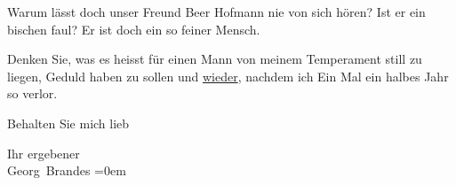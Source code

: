 \pstart
           Warum lässt doch unser Freund Beer Hofmann nie
               von sich hören? Ist er ein bischen faul? Er ist doch ein so feiner Mensch.\pend
           
\pstart
           Denken Sie, was es heisst für einen Mann von meinem Temperament still zu liegen,
               Geduld haben zu sollen und \uline{wieder}, nachdem ich Ein
               Mal ein halbes Jahr so verlor.\pend
           
\pstart
           Behalten Sie mich lieb\pend
           
\pstart
           Ihr ergebener{\\[\baselineskip]}\spacefill\mbox{Georg Brandes}\pend
           \leftskip=0em{}\endnumbering{}  
      